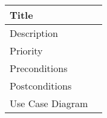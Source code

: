 \subsubsection{}
  \begin{table}[h!]
    \caption{}
    \label{evolutionary-requirements/functional-requirements}
    \begin{tabularx}{\textwidth}{|l|X|}
      \hline
      Title            &  \\ \hline
      Description      &  \\ \hline
      Priority         &  \\ \hline
      Preconditions    &  \\ \hline
      Postconditions   & \\ \hline
      Use Case Diagram & \\ \hline
    \end{tabularx}
  \end{table}
